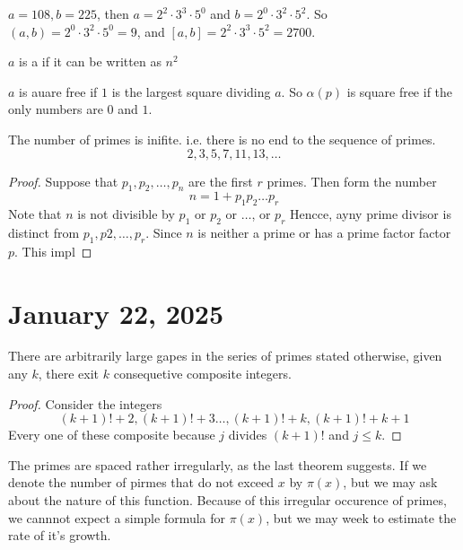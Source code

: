 \documentclass[11pt]{article}
\begin{document}
\begin{example}
    \(a = 108, b = 225\), then \(a = 2^2 \cdot 3^3 \cdot 5^0\) and \(b = 2^0 \cdot 3^2 \cdot 5^2\). So \((a, b) = 2^0 \cdot 3^2 \cdot 5^0 = 9\), and \([a, b] = 2^2 \cdot 3^3 \cdot 5^2 = 2700\).
\end{example}

\begin{definition}
    \(a\) is a  if it can be written as \(n^2\)
\end{definition}
\begin{remark}
    \(a\) is auare free if \(1\) is the largest square dividing \(a\). So \(\alpha(p)\) is square free if the only numbers are \(0\) and \(1\).
\end{remark}

\begin{theorem}[Euclid]\label{1.17}
    The number of primes is inifite. i.e. there is no end to the sequence of primes. \[2, 3, 5, 7, 11, 13, \ldots\]
\end{theorem}

\begin{proof}
    Suppose that \(p_1, p_2, \ldots, p_n\) are the first \(r\) primes. Then form the number \[n = 1 + p_1 p_2\ldots p_r\]
    Note that \(n\) is not divisible by \(p_1\) or \(p_2\) or \(\ldots\), or
    \(p_r\) Hencce, ayny prime divisor is distinct from \(p_1, p2, \ldots, p_r\).
    Since \(n\) is neither a prime or has a prime factor factor \(p\). This impl
\end{proof}
\section{January 22, 2025}
\begin{theorem}\label{1.18}
    There are arbitrarily large gapes in the series of primes stated otherwise, given any \(k\), there exit \(k\) consequetive composite integers.
\end{theorem}
\begin{proof}
    Consider the integers
    \[(k + 1)! + 2, (k + 1)! + 3 \ldots, (k + 1)! + k, (k + 1)! + k + 1\]
    Every one of these composite because \(j\) divides \((k + 1)!\) and \(j
    \leqslant k\).
\end{proof}

The primes are spaced rather irregularly, as the last theorem suggests. If we
denote the number of pirmes that do not exceed \(x\) by \(\pi(x)\), but we may
ask about the nature of this function. Because of this irregular occurence of
primes, we cannnot expect a simple formula for \(\pi(x)\), but we may week to
estimate the rate of it's growth.
\end{document}
